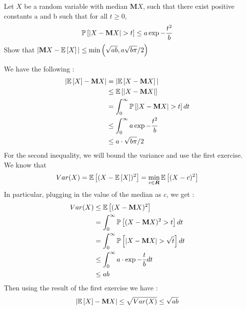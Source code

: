 \begin{exercise}{}
	Let $ X $ be a random variable with median $ \textbf{M}X $, such that there exist positive constants a and b such that for all $ t\geq 0 $,
\begin{equation*}
	\mathbb{P}\left[|X - \textbf{M}X| >t\right] \leq a \exp{-\frac{t^2}{b}}
\end{equation*}
Show that $ |\textbf{M}X - \mathbb{E}\left[X\right]| \leq \min \left( \sqrt{ab},a \sqrt{b \pi}/2 \right) $

\end{exercise}

\begin{solution}
We have the following :
\begin{align*}
	|\mathbb{E}\left[X\right] - \textbf{M}X| &= |\mathbb{E}\left[X - \textbf{M}X\right]| \\
			       &\leq \mathbb{E}\left[|X - \textbf{M}X|\right] \\
			       &= \int_0^\infty \mathbb{P}\left[|X-\textbf{M}X| >t\right]dt \\
			       &\leq \int_0^\infty a\exp{-\frac{t^2}{b}}\\
			       &\leq a\cdot \sqrt{b \pi}/2 
\end{align*}
For the second inequality, we will bound the variance and use the first exercise. We know that
\begin{equation*}
	Var(X) = \mathbb{E}\left[(X-\mathbb{E}\left[X\right])^2\right] = \min_{c\in \boldsymbol{R}}\mathbb{E}\left[(X-c)^2\right]
\end{equation*}
In particular, plugging in the value of the median as $ c $, we get :
\begin{align*}
	Var(X) &\leq \mathbb{E}\left[(X- \textbf{M}X)^2\right] \\
	       &= \int_0^\infty \mathbb{P}\left[(X- \textbf{M}X)^2 > t\right]dt \\
	       &= \int_0^\infty \mathbb{P}\left[|X - \textbf{M}X| > \sqrt{t}\right]dt \\
	       &\leq \int_0^\infty a\cdot \exp{-\frac{t}{b}}dt\\
	       &\leq ab
\end{align*}
Then using the result of the first exercise we have :
\begin{equation*}
	|\mathbb{E}\left[X\right]-\textbf{M}X| \leq \sqrt{Var(X)} \leq \sqrt{ab}
\end{equation*}
\end{solution}
